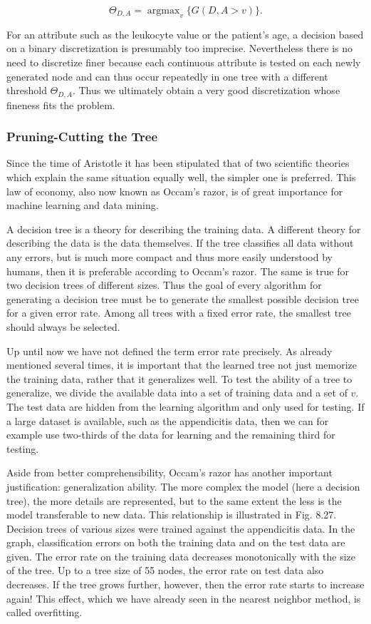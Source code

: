 \documentclass[10pt]{article}
\begin{document}
$$
\Theta_{D, A}=\operatorname{argmax}_{v}\{G(D, A>v)\} .
$$

For an attribute such as the leukocyte value or the patient's age, a decision based on a binary discretization is presumably too imprecise. Nevertheless there is no need to discretize finer because each continuous attribute is tested on each newly generated node and can thus occur repeatedly in one tree with a different threshold $\Theta_{D, A}$. Thus we ultimately obtain a very good discretization whose fineness fits the problem.

\subsubsection*{Pruning-Cutting the Tree}
Since the time of Aristotle it has been stipulated that of two scientific theories which explain the same situation equally well, the simpler one is preferred. This law of economy, also now known as Occam's razor, is of great importance for machine learning and data mining.

A decision tree is a theory for describing the training data. A different theory for describing the data is the data themselves. If the tree classifies all data without any errors, but is much more compact and thus more easily understood by humans, then it is preferable according to Occam's razor. The same is true for two decision trees of different sizes. Thus the goal of every algorithm for generating a decision tree must be to generate the smallest possible decision tree for a given error rate. Among all trees with a fixed error rate, the smallest tree should always be selected.

Up until now we have not defined the term error rate precisely. As already mentioned several times, it is important that the learned tree not just memorize the training data, rather that it generalizes well. To test the ability of a tree to generalize, we divide the available data into a set of training data and a set of $v$. The test data are hidden from the learning algorithm and only used for testing. If a large dataset is available, such as the appendicitis data, then we can for example use two-thirds of the data for learning and the remaining third for testing.

Aside from better comprehensibility, Occam's razor has another important justification: generalization ability. The more complex the model (here a decision tree), the more details are represented, but to the same extent the less is the model transferable to new data. This relationship is illustrated in Fig. 8.27. Decision trees of various sizes were trained against the appendicitis data. In the graph, classification errors on both the training data and on the test data are given. The error rate on the training data decreases monotonically with the size of the tree. Up to a tree size of 55 nodes, the error rate on test data also decreases. If the tree grows further, however, then the error rate starts to increase again! This effect, which we have already seen in the nearest neighbor method, is called overfitting.
\end{document}
